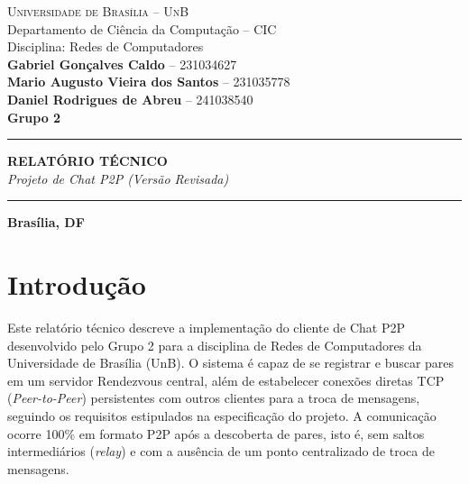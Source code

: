 \documentclass[12pt,a4paper]{article}
\begin{document}
\begin{titlepage}
    \begin{center}
        {\Large \textsc{Universidade de Brasília -- UnB}}\\[0.2cm]
        {\large Departamento de Ciência da Computação -- CIC}\\[0.2cm]
        {\large Disciplina: Redes de Computadores}\\[3cm]

        {\large \textbf{Gabriel Gonçalves Caldo} -- 231034627}\\
        {\large \textbf{Mario Augusto Vieira dos Santos} -- 231035778}\\
        {\large \textbf{Daniel Rodrigues de Abreu} -- 241038540}\\[0.5cm]
        {\large \textbf{Grupo 2}}\\[4cm]

        \hrule
        \vspace{0.8cm}
        {\huge \textbf{RELATÓRIO TÉCNICO}}\\[0.4cm]
        {\LARGE \textit{Projeto de Chat P2P (Versão Revisada)}}\\[0.8cm]
        \hrule
        \vfill

        {\large \textbf{Brasília, DF}}\\
        {\large \textbf{\the\year}}
    \end{center}
\end{titlepage}

\tableofcontents
\newpage


\section{Introdução}
Este relatório técnico descreve a implementação do cliente de Chat P2P desenvolvido pelo Grupo 2 para a disciplina de Redes de Computadores da Universidade de Brasília (UnB). O sistema é capaz de se registrar e buscar pares em um servidor Rendezvous central, além de estabelecer conexões diretas TCP (\textit{Peer-to-Peer}) persistentes com outros clientes para a troca de mensagens, seguindo os requisitos estipulados na especificação do projeto. A comunicação ocorre 100\% em formato P2P após a descoberta de pares, isto é, sem saltos intermediários (\textit{relay}) e com a ausência de um ponto centralizado de troca de mensagens.
\end{document}
